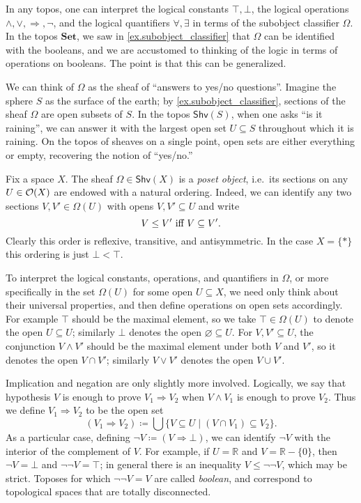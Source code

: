 \documentclass[11pt, oneside, article]{memoir}
\theoremstyle{plain}
\theoremstyle{definition}
\theoremstyle{remark}
\renewcommand{\ss}{\subseteq}
\newcommand{\Cat}[1]{\mathbf{#1}}
\newcommand{\Fun}[1]{\mathsf{#1}}
\newcommand{\smset}{\Cat{Set}}
\newcommand{\tn}[1]{\textnormal{#1}}
\newcommand{\rr}{\mathbb{R}}
\newcommand{\shv}{\Fun{Shv}}
\newcommand{\Op}[1][undef]{\ifthenelse{\equal{#1}{undef}}{\mathcal{O}}{\mathcal{O}(#1)}}
\newcommand{\imp}{\Rightarrow}
\newcommand{\true}{\top}
\newcommand{\false}{\bot}
\begin{document}
In any topos, one can interpret the logical constants $\true,\false$, the logical operations $\wedge,\vee,\imp,\neg$, and the logical quantifiers $\forall,\exists$ in terms of the subobject classifier $\Omega$. In the topos $\smset$, we saw in \cref{ex.subobject_classifier} that $\Omega$ can be identified with the booleans, and we are accustomed to thinking of the logic in terms of operations on booleans. The point is that this can be generalized.

We can think of $\Omega$ as the sheaf of ``answers to yes/no questions''. Imagine the sphere $S$ as the surface of the earth; by \cref{ex.subobject_classifier}, sections of the sheaf $\Omega$ are open subsets of $S$. In the topos $\shv(S)$, when one asks ``is it raining'', we can answer it with the largest open set $U\ss S$ throughout which it is raining. On the topos of sheaves on a single point, open sets are either everything or empty, recovering the notion of ``yes/no.''

Fix a space $X$. The sheaf $\Omega\in\shv(X)$ is a \emph{poset object}, i.e.\ its sections on any $U\in\Op[X]$ are endowed with a natural ordering. Indeed, we can identify any two sections $V,V'\in\Omega(U)$ with opens $V,V'\ss U$ and write
\begin{equation}\label{eqn.prop_order}
V\leq V'\tn{ iff }V\ss V'.
\end{equation} 
Clearly this order is reflexive, transitive, and antisymmetric. In the case $X=\{*\}$ this ordering is just $\false<\true$.

To interpret the logical constants, operations, and quantifiers in $\Omega$, or more specifically in the set $\Omega(U)$ for some open $U\ss X$, we need only think about their universal properties, and then define operations on open sets accordingly. For example $\true$ should be the maximal element, so we take $\true\in\Omega(U)$ to denote the open $U\ss U$; similarly $\false$ denotes the open $\varnothing\ss U$. For $V,V'\ss U$, the conjunction $V\wedge V'$ should be the maximal element under both $V$ and $V'$, so it denotes the open $V\cap V'$; similarly $V\vee V'$ denotes the open $V\cup V'$.

Implication and negation are only slightly more involved. Logically, we say that hypothesis $V$ is enough to prove $V_1\imp V_2$ when $V\wedge V_1$ is enough to prove $V_2$. Thus we define $V_1\imp V_2$ to be the open set
\begin{equation}\label{eqn.implication}
	(V_1\imp V_2)\coloneqq\bigcup\{V\ss U\mid (V\cap V_1)\ss V_2\}.
\end{equation}
 As a particular case, defining $\neg V\coloneqq (V\imp \false)$, we can identify $\neg V$ with the interior of the complement of $V$. For example, if $U=\rr$ and $V=\rr-\{0\}$, then $\neg V=\false$ and $\neg\neg V=\true$; in general there is an inequality $V\leq\neg\neg V$, which may be strict. Toposes for which $\neg\neg V=V$ are called \emph{boolean}, and correspond to topological spaces that are totally disconnected.
\end{document}

